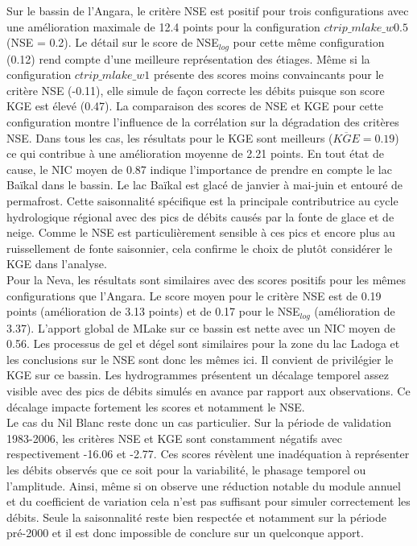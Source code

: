 Sur le bassin de l'Angara, le critère NSE est positif pour trois configurations avec une amélioration maximale de 12.4 points pour la configuration $ctrip\_mlake\_w0.5$ (NSE = 0.2). Le détail sur le score de NSE$_{log}$ pour cette même configuration (0.12) rend compte d'une meilleure représentation des étiages. Même si la configuration $ctrip\_mlake\_w1$ présente des scores moins convaincants pour le critère NSE (-0.11), elle simule de façon correcte les débits puisque son score KGE est élevé (0.47). La comparaison des scores de NSE et KGE pour cette configuration montre l'influence de la corrélation sur la dégradation des critères NSE. Dans tous les cas, les résultats pour le KGE sont meilleurs ($\overline{KGE}=0.19$) ce qui contribue à une amélioration moyenne de 2.21 points. En tout état de cause, le NIC moyen de 0.87 indique l'importance de prendre en compte le lac Baïkal dans le bassin. Le lac Baïkal est glacé de janvier à mai-juin et entouré de permafrost. Cette saisonnalité spécifique est la principale contributrice au cycle hydrologique régional avec des pics de débits causés par la fonte de glace et de neige. Comme le NSE est particulièrement sensible à ces pics et encore plus au ruissellement de fonte saisonnier, cela confirme le choix de plutôt considérer le KGE dans l'analyse. \\

Pour la Neva, les résultats sont similaires avec des scores positifs pour les mêmes configurations que l'Angara. Le score moyen pour le critère NSE est de 0.19 points (amélioration de 3.13 points) et de 0.17 pour le NSE$_{log}$ (amélioration de 3.37). L'apport global de MLake sur ce bassin est nette avec un NIC moyen de 0.56. Les processus de gel et dégel sont similaires pour la zone du lac Ladoga et les conclusions sur le NSE sont donc les mêmes ici. Il convient de privilégier le KGE sur ce bassin. Les hydrogrammes présentent un décalage temporel assez visible avec des pics de débits simulés en avance par rapport aux observations. Ce décalage impacte fortement les scores et notamment le NSE.\\

Le cas du Nil Blanc reste donc un cas particulier. Sur la période de validation 1983-2006, les critères NSE et KGE sont constamment négatifs avec respectivement -16.06 et -2.77. Ces scores révèlent une inadéquation à représenter les débits observés que ce soit pour la variabilité, le phasage temporel ou l'amplitude. Ainsi, même si on observe une réduction notable du module annuel et du coefficient de variation cela n'est pas suffisant pour simuler correctement les débits. Seule la saisonnalité reste bien respectée et notamment sur la période pré-2000 et il est donc impossible de conclure sur un quelconque apport.\\

